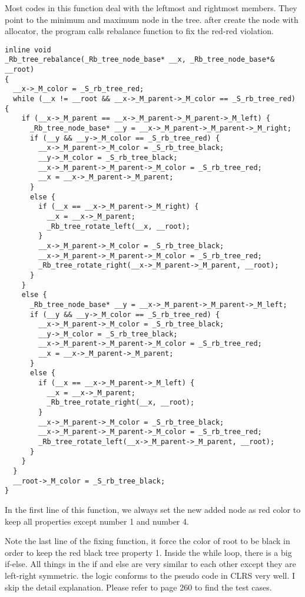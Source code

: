 \documentclass{article}
\begin{document}
Most codes in this function deal with the leftmost and rightmost
members. They point to the minimum and maximum node in the tree. after
create the node with allocator, the program calls rebalance function
to fix the red-red violation.

\begin{lstlisting}
inline void 
_Rb_tree_rebalance(_Rb_tree_node_base* __x, _Rb_tree_node_base*& __root)
{
  __x->_M_color = _S_rb_tree_red;
  while (__x != __root && __x->_M_parent->_M_color == _S_rb_tree_red) {
    if (__x->_M_parent == __x->_M_parent->_M_parent->_M_left) {
      _Rb_tree_node_base* __y = __x->_M_parent->_M_parent->_M_right;
      if (__y && __y->_M_color == _S_rb_tree_red) {
        __x->_M_parent->_M_color = _S_rb_tree_black;
        __y->_M_color = _S_rb_tree_black;
        __x->_M_parent->_M_parent->_M_color = _S_rb_tree_red;
        __x = __x->_M_parent->_M_parent;
      }
      else {
        if (__x == __x->_M_parent->_M_right) {
          __x = __x->_M_parent;
          _Rb_tree_rotate_left(__x, __root);
        }
        __x->_M_parent->_M_color = _S_rb_tree_black;
        __x->_M_parent->_M_parent->_M_color = _S_rb_tree_red;
        _Rb_tree_rotate_right(__x->_M_parent->_M_parent, __root);
      }
    }
    else {
      _Rb_tree_node_base* __y = __x->_M_parent->_M_parent->_M_left;
      if (__y && __y->_M_color == _S_rb_tree_red) {
        __x->_M_parent->_M_color = _S_rb_tree_black;
        __y->_M_color = _S_rb_tree_black;
        __x->_M_parent->_M_parent->_M_color = _S_rb_tree_red;
        __x = __x->_M_parent->_M_parent;
      }
      else {
        if (__x == __x->_M_parent->_M_left) {
          __x = __x->_M_parent;
          _Rb_tree_rotate_right(__x, __root);
        }
        __x->_M_parent->_M_color = _S_rb_tree_black;
        __x->_M_parent->_M_parent->_M_color = _S_rb_tree_red;
        _Rb_tree_rotate_left(__x->_M_parent->_M_parent, __root);
      }
    }
  }
  __root->_M_color = _S_rb_tree_black;
}
\end{lstlisting}

In the first line of this function, we always set the new added node as
red color to keep all properties except number 1 and number 4.

Note the last line of the fixing function, it force the color of root
to be black in order to keep the red black tree property 1. Inside the
while loop, there is a big if-else. All things in the if and else are
very similar to each other except they are left-right symmetric. the
logic conforms to the pseudo code in CLRS very well. I skip the detail
explanation. Please refer to \cite{hj-stl} page 260 to find the test cases.
\end{document}
